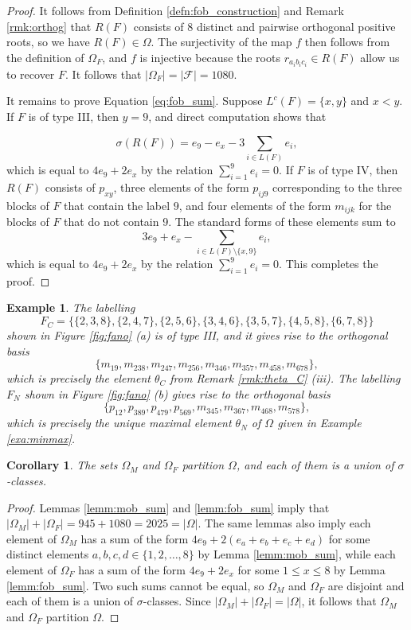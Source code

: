 \documentclass[10pt,a4paper]{amsart}
\newtheorem{cor}[theorem]{Corollary}
\newtheorem{exa}[theorem]{Example}
\numberwithin{equation}{section}
\newcommand{\lc}{L^c}
\newcommand{\calf}{\mathcal{F}}
\newcommand{\ob}{\Omega}
\newcommand{\fob}{\Omega_F}
\newcommand{\mob}{\Omega_M}
\newcommand{\abs}[1]{\lvert #1 \rvert}
\begin{document}
\begin{proof}
It follows from Definition \ref{defn:fob_construction} and Remark
\ref{rmk:orthog} that $R(F)$ consists of 8 distinct and pairwise orthogonal
positive roots, so we have $R(F)\in \ob$. The surjectivity of the map $f$ then
follows from the definition of $\fob$, and $f$ is injective because the roots
$r_{a_ib_ic_i}\in R(F)$ allow us to recover $F$. It follows that
$\abs{\fob}=\abs{\calf}=1080.$

It remains to prove Equation \eqref{eq:fob_sum}. Suppose $\lc(F)=\{x,y\}$ and
$x<y$. If $F$ is of type III, then $y=9$, and direct computation shows that

\[
\sigma(R(F))=e_9-e_x-3\sum_{i\in L(F)}e_i,\] 
which is equal to $4e_9+2e_x$ by the relation $\sum_{i=1}^9e _i = 0$. If $F$ is of type
IV, then $R(F)$ consists of $p_{xy}$, three elements of the form $p_{ij9}$
corresponding to the three blocks of $F$ that contain the label $9$, and four
elements of the form $m_{ijk}$ for the blocks of $F$ that do not contain 9.
The standard forms of these elements sum to
\[
  3e_9+e_x-\sum_{i\in L(F)\setminus\{x,9\}}e_i,
  \]
which is equal to $4e_9+2e_x$ by the relation $\sum_{i=1}^9e _i = 0$. This
completes the proof.
\end{proof}

\begin{exa}
\label{exa:fob_exa}
The labelling 
\[
  F_C=\{\{2,3,8\},\{2,4,7\},\{2,5,6\},\{3,4,6\},\{3,5,7\}, \{4,5,8\},
\{6,7,8\}\}
\] 
shown in Figure \ref{fig:fano} (a) is of type III, and it
gives rise to the orthogonal basis 
\[
\{m_{19}, m_{238}, m_{247}, m_{256}, m_{346}, m_{357}, m_{458}, m_{678}\},
\]
which is precisely the element $\theta_C$ from Remark \ref{rmk:theta_C} (iii).
The labelling $F_N$ shown in Figure \ref{fig:fano} (b) gives rise to the orthogonal
basis
\[
\{p_{12}, p_{389}, p_{479}, p_{569}, m_{345}, m_{367}, m_{468}, m_{578}\},
\]
which is precisely the unique maximal element $\theta_N$ of $\ob$ given in Example
\ref{exa:minmax}. 
\end{exa}


\begin{cor}\label{cor:all}
The sets $\mob$ and $\fob$ partition $\ob$, and each of them is a union of
$\sigma$-classes.
\end{cor}

\begin{proof}
  Lemmas \ref{lemm:mob_sum} and \ref{lemm:fob_sum} imply that
  $\abs{\mob}+\abs{\fob}=945+1080=2025=\abs{\ob}$. The same lemmas also imply
  each element of $\mob$ has a sum of the form $4e_9+2(e_a+e_b+e_c+e_d)$ for
  some distinct elements $a,b,c,d\in \{1,2,\dots,8\}$ by Lemma
  \ref{lemm:mob_sum}, while each element of $\fob$ has a sum of the form
  $4e_9+2e_x$ for some $1\le x\le 8$ by Lemma \ref{lemm:fob_sum}. Two such sums
  cannot be equal, so $\mob$ and $\fob$ are disjoint and each of them is a union
  of $\sigma$-classes. Since $\abs{\mob}+\abs{\fob}=\abs{\ob}$, it follows that
$\mob$ and $\fob$ partition $\ob$. \end{proof}
\end{document}
